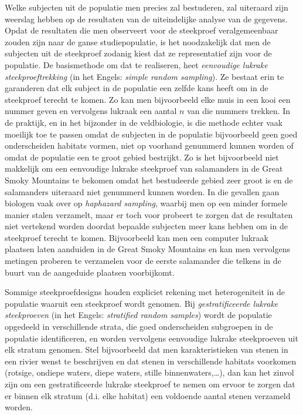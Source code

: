 \documentclass[
  dutch,
  letterpaper,
  12pt]{book}
\theoremstyle{definition}
\theoremstyle{definition}
\theoremstyle{definition}
\theoremstyle{remark}
\begin{document}
Welke subjecten uit de populatie men precies zal bestuderen, zal
uiteraard zijn weerslag hebben op de resultaten van de uiteindelijke
analyse van de gegevens. Opdat de resultaten die men observeert voor de
steekproef veralgemeenbaar zouden zijn naar de ganse studiepopulatie, is
het noodzakelijk dat men de subjecten uit de steekproef zodanig kiest
dat ze representatief zijn voor de populatie. De basismethode om dat te
realiseren, heet \emph{eenvoudige lukrake steekproeftrekking} (in het
Engels: \emph{simple random sampling}). Ze bestaat erin te garanderen
dat elk subject in de populatie een zelfde kans heeft om in de
steekproef terecht te komen. Zo kan men bijvoorbeeld elke muis in een
kooi een nummer geven en vervolgens lukraak een aantal \(n\) van die
nummers trekken. In de praktijk, en in het bijzonder in de veldbiologie,
is die methode echter vaak moeilijk toe te passen omdat de subjecten in
de populatie bijvoorbeeld geen goed onderscheiden habitats vormen, niet
op voorhand genummerd kunnen worden of omdat de populatie een te groot
gebied bestrijkt. Zo is het bijvoorbeeld niet makkelijk om een
eenvoudige lukrake steekproef van salamanders in de Great Smoky
Mountains te bekomen omdat het bestudeerde gebied zeer groot is en de
salamanders uiteraard niet genummerd kunnen worden. In die gevallen gaan
biologen vaak over op \emph{haphazard sampling}, waarbij men op een
minder formele manier stalen verzamelt, maar er toch voor probeert te
zorgen dat de resultaten niet vertekend worden doordat bepaalde
subjecten meer kans hebben om in de steekproef terecht te komen.
Bijvoorbeeld kan men een computer lukraak plaatsen laten aanduiden in de
Great Smoky Mountains en kan men vervolgens metingen proberen te
verzamelen voor de eerste salamander die telkens in de buurt van de
aangeduide plaatsen voorbijkomt.

Sommige steekproefdesigns houden expliciet rekening met heterogeniteit
in de populatie waaruit een steekproef wordt genomen. Bij
\emph{gestratificeerde lukrake steekproeven} (in het Engels:
\emph{stratified random samples}) wordt de populatie opgedeeld in
verschillende strata, die goed onderscheiden subgroepen in de populatie
identificeren, en worden vervolgens eenvoudige lukrake steekproeven uit
elk stratum genomen. Stel bijvoorbeeld dat men karakteristieken van
stenen in een rivier wenst te beschrijven en dat stenen in verschillende
habitats voorkomen (rotsige, ondiepe waters, diepe waters, stille
binnenwaters,\ldots), dan kan het zinvol zijn om een gestratificeerde
lukrake steekproef te nemen om ervoor te zorgen dat er binnen elk
stratum (d.i. elke habitat) een voldoende aantal stenen verzameld
worden.
\end{document}
